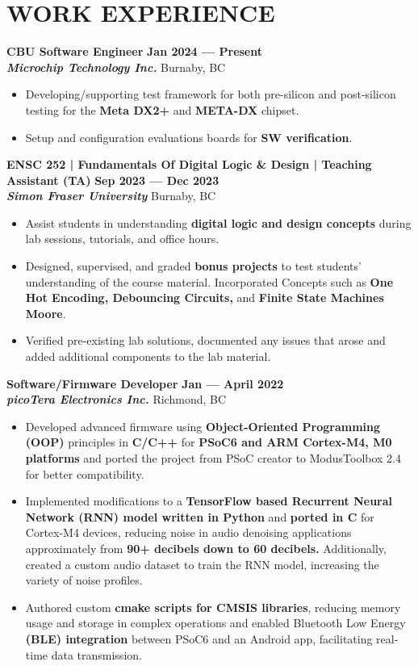 \documentclass[letterpaper,11pt]{article}
\newcommand{\Item} [1] {
    \item\small{{#1 \vspace{-2pt}}}
}
\newcommand{\employer} [5] {
    {\textbf{#3} \hfill \textbf{#4 --- #5}\\ \textbf{\emph{#1}} \hfill #2\\}
}
\newcommand{\workItemListStart} [0] {
    \vspace{-1pt}
    \begin{itemize}[topsep=0pt,itemsep=-2pt]
}
\newcommand{\workItemListEnd} [0] {
    \end{itemize}
    \vspace{1pt}
}
\begin{document}
    \section{WORK EXPERIENCE}
    \employer{Microchip Technology Inc.}{Burnaby, BC}{CBU Software Engineer}{Jan 2024}{Present}
    \workItemListStart{}
        \Item{Developing/supporting test framework for both pre-silicon and post-silicon testing for the \textbf{Meta DX2+} and \textbf{META-DX} chipset.}
        \Item{Setup and configuration evaluations boards for \textbf{SW verification}.}
    \workItemListEnd{}
    \employer{Simon Fraser University}{Burnaby, BC}{ENSC 252 | Fundamentals Of Digital Logic \& Design | Teaching Assistant (TA)}{Sep 2023}{Dec 2023}
    \workItemListStart{}
    \Item{Assist students in understanding \textbf{digital logic and design concepts} during lab sessions, tutorials, and office hours.}
    \Item{Designed, supervised, and graded \textbf{bonus projects} to test students' understanding of the course material. Incorporated Concepts such as \textbf{One Hot Encoding, Debouncing Circuits,} and \textbf{Finite State Machines {Moore}}.}
    \Item{Verified pre-existing lab solutions, documented any issues that arose and added additional components to the lab material.}
    \workItemListEnd{}
    \employer{picoTera Electronics Inc.}{Richmond, BC}{Software/Firmware Developer}{Jan}{April 2022}
    \workItemListStart{}
        \Item{Developed advanced firmware using \textbf{Object-Oriented Programming (OOP)} principles in \textbf{C/C++} for \textbf{PSoC6 and ARM Cortex-M4, M0 platforms} and ported the project from PSoC creator to ModusToolbox 2.4 for better compatibility.}
        \Item{Implemented modifications to a \textbf{TensorFlow based Recurrent Neural Network (RNN) model written in Python} and \textbf{ported in C} for Cortex-M4 devices, reducing noise in audio denoising applications approximately from \textbf{90+ decibels down to 60 decibels.} Additionally, created a custom audio dataset to train the RNN model, increasing the variety of noise profiles.}
        \Item{Authored custom \textbf{cmake scripts for CMSIS libraries}, reducing memory usage and storage in complex operations and enabled Bluetooth Low Energy \textbf{(BLE) integration} between PSoC6 and an Android app, facilitating real-time data transmission.}
    \workItemListEnd{}

\end{document}
